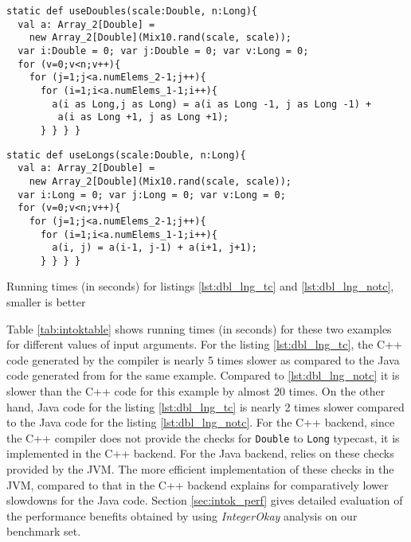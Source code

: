 \begin{lstlisting}[caption={Example for using \texttt{Double} variables for
array indexing},label={lst:dbl_lng_tc},language=x10,numbers=none]
static def useDoubles(scale:Double, n:Long){
  val a: Array_2[Double] = 
    new Array_2[Double](Mix10.rand(scale, scale));
  var i:Double = 0; var j:Double = 0; var v:Long = 0;
  for (v=0;v<n;v++){
    for (j=1;j<a.numElems_2-1;j++){
      for (i=1;i<a.numElems_1-1;i++){
        a(i as Long,j as Long) = a(i as Long -1, j as Long -1) + 
         a(i as Long +1, j as Long +1);
      } } } } 
\end{lstlisting}

\begin{lstlisting}[caption={Example for using \texttt{Long} variables for
indexing},label={lst:dbl_lng_notc},language=x10,numbers=none]
static def useLongs(scale:Double, n:Long){
  val a: Array_2[Double] = 
    new Array_2[Double](Mix10.rand(scale, scale));
  var i:Long = 0; var j:Long = 0; var v:Long = 0;
  for (v=0;v<n;v++){
    for (j=1;j<a.numElems_2-1;j++){
      for (i=1;i<a.numElems_1-1;i++){
        a(i, j) = a(i-1, j-1) + a(i+1, j+1);
      } } } }
\end{lstlisting}

\begin{table}[htbp]
\begin{center}

\caption{Running times (in seconds) for listings \ref{lst:dbl_lng_tc} and
\ref{lst:dbl_lng_notc}, smaller is better}
\label{tab:intoktable}
\end{center}
\end{table}

Table \ref{tab:intoktable} shows running times (in seconds) for these
two examples for different values of input arguments. For the listing
\ref{lst:dbl_lng_tc}, the C++ code generated by the \xten compiler is
nearly 5 times slower as compared to the Java code generated from \xten for
the same example.  Compared to \ref{lst:dbl_lng_notc} it is slower than
the C++ code for this example by almost 20 times. On the other hand,
Java code for the listing \ref{lst:dbl_lng_tc} is nearly 2 times slower
compared to the Java code for the listing \ref{lst:dbl_lng_notc}.  For
the C++ backend, since the C++ compiler does not provide the checks for
\texttt{Double} to \texttt{Long} typecast, it is implemented in the
\xten C++ backend. For the Java backend, \xten relies on these checks
provided by the JVM.  The more efficient implementation of these checks
in the JVM, compared to that in the \xten C++ backend explains for
comparatively lower slowdowns for the Java code. Section
\ref{sec:intok_perf} gives detailed evaluation of the performance
benefits obtained by using \emph{IntegerOkay} analysis on our benchmark
set.

